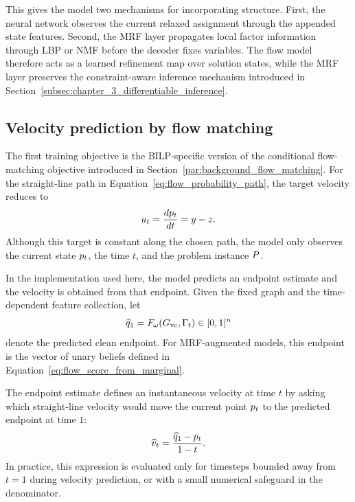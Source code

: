 This gives the model two mechanisms for incorporating structure. First, the neural network observes the current relaxed assignment through the appended state features. Second, the MRF layer propagates local factor information through LBP or NMF before the decoder fixes variables. The flow model therefore acts as a learned refinement map over solution states, while the MRF layer preserves the constraint-aware inference mechanism introduced in Section~\ref{subsec:chapter_3_differentiable_inference}.

\subsection{Velocity prediction by flow matching}

The first training objective is the BILP-specific version of the conditional flow-matching objective introduced in Section~\ref{par:background_flow_matching}. For the straight-line path in Equation~\eqref{eq:flow_probability_path}, the target velocity reduces to
\begin{equation}
    u_t = \frac{d p_t}{dt} = y - z .
    \label{eq:flow_target_velocity}
\end{equation}
Although this target is constant along the chosen path, the model only observes the current state $p_t$, the time $t$, and the problem instance $P$.

In the implementation used here, the model predicts an endpoint estimate and the velocity is obtained from that endpoint. Given the fixed graph and the time-dependent feature collection, let
\begin{equation}
    \widehat {q}_1 = F_{\omega}(G_{\mathrm{vc}}, \Gamma_t) \in [0,1]^n
\end{equation}
denote the predicted clean endpoint. For MRF-augmented models, this endpoint is the vector of unary beliefs defined in Equation~\eqref{eq:flow_score_from_marginal}.

The endpoint estimate defines an instantaneous velocity at time $t$ by asking which straight-line velocity would move the current point $p_t$ to the predicted endpoint at time $1$:
\begin{equation}
    \widehat {v}_t = \frac{\widehat {q}_1 - p_t}{1-t}.
    \label{eq:endpoint_to_velocity}
\end{equation}
In practice, this expression is evaluated only for timesteps bounded away from $t=1$ during velocity prediction, or with a small numerical safeguard in the denominator.

